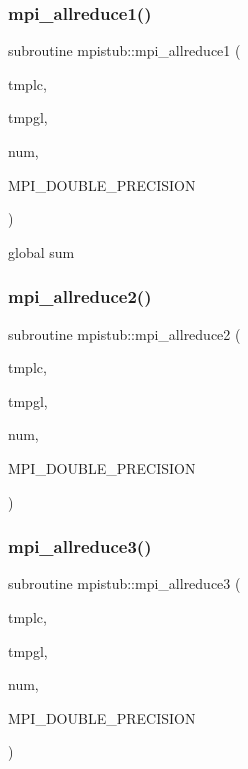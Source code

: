 \subsubsection{\texorpdfstring{mpi\_allreduce1()}{mpi\_allreduce1()}}
{\footnotesize\ttfamily subroutine mpistub\+::mpi\+\_\+allreduce1 (\begin{DoxyParamCaption}\item[{double precision, dimension(\+:)}]{tmplc,  }\item[{double precision, dimension(\+:)}]{tmpgl,  }\item[{}]{num,  }\item[{}]{M\+P\+I\+\_\+\+D\+O\+U\+B\+L\+E\+\_\+\+P\+R\+E\+C\+I\+S\+I\+ON }\end{DoxyParamCaption})}



global sum 

\mbox{\label{namespacempistub_a8d115cae5e65c2a2bc7679f25da7b08a}} 
\subsubsection{\texorpdfstring{mpi\_allreduce2()}{mpi\_allreduce2()}}
{\footnotesize\ttfamily subroutine mpistub\+::mpi\+\_\+allreduce2 (\begin{DoxyParamCaption}\item[{double precision}]{tmplc,  }\item[{double precision}]{tmpgl,  }\item[{}]{num,  }\item[{}]{M\+P\+I\+\_\+\+D\+O\+U\+B\+L\+E\+\_\+\+P\+R\+E\+C\+I\+S\+I\+ON }\end{DoxyParamCaption})}

\mbox{\label{namespacempistub_a4193e72879e62788a983d1c7e73ff08c}} 
\subsubsection{\texorpdfstring{mpi\_allreduce3()}{mpi\_allreduce3()}}
{\footnotesize\ttfamily subroutine mpistub\+::mpi\+\_\+allreduce3 (\begin{DoxyParamCaption}\item[{integer, dimension(\+:)}]{tmplc,  }\item[{integer, dimension(\+:)}]{tmpgl,  }\item[{}]{num,  }\item[{}]{M\+P\+I\+\_\+\+D\+O\+U\+B\+L\+E\+\_\+\+P\+R\+E\+C\+I\+S\+I\+ON }\end{DoxyParamCaption})}

